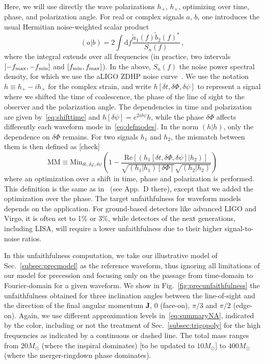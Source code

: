 \documentclass[aps,showpacs,twocolumn,
prd,superscriptaddress,nofootinbib]{revtex4-1}
\newcommand{\be}{\begin{equation}}
\newcommand{\ee}{\end{equation}}
\newcommand\ud{{\mathrm{d}}}
\newcommand{\Msol}{M_{\odot}}
\newcommand{\SM}[1]{{\color{Red} #1}}
\begin{document}
Here, we will use directly the wave polarizations $h_{+}$, $h_{\times}$, optimizing over time, phase, and polarization angle. For real or complex signals $a$, $b$, one introduces the usual Hermitian noise-weighted scalar product~\cite{CF94}
\be\label{eq:defoverlap}
	\left( a | b \right) = 2 \int \ud f \frac{\tilde{a}_{1}(f) \tilde{b}_{2}(f)^{*}}{S_{n}(f)} \,,
\ee
where the integral extends over all frequencies (in practice, two intervals $[-f_{\rm max}, -f_{\rm min}]$ and $[f_{\rm min}, f_{\rm max}]$). In the above, $S_{n}(f)$ the noise power spectral density, for which we use the aLIGO ZDHP noise curve~\cite{LIGOProspects13}. We use the notation $h \equiv h_{+} - i h_{\times}$ for the complex strain, and write $h[\delta t, \delta \Phi, \delta \psi]$ to represent a signal where we shifted the time of coalescence, the phase of the line of sight to the observer and the polarization angle. The dependencies in time and polarization are given by~\eqref{eq:shifttime} and $h[\delta \psi] = e^{2 i \delta \psi} h$, while the phase $\delta \Phi$ affects differently each waveform mode in~\eqref{eq:defmodes}. In the norm $(h|h)$, only the dependence on $\delta\Phi$ remains. For two signals $h_{1}$ and $h_{2}$, the mismatch between them is then defined as \SM{[check]}
\be\label{eq:defMM}
	\mathrm{MM} \equiv \mathrm{Min}_{\delta t, \delta \varphi, \delta \psi} \left( 1 - \frac{ \mathrm{Re} \left[ (h_{1}[\delta t, \delta \Phi, \delta \psi] | h_{2}) \right]}{\sqrt{(h_{1}|h_{1})[\delta\Phi]}\sqrt{(h_{2}|h_{2})}} \right)
\ee
where an optimization over a shift in time, phase and polarization is performed. This definition is the same as in~\cite{Blackman+17a} (see App.~D there), except that we added the optimization over the phase. The target unfaithfulness for waveform models depends on the application. For ground-based detectors like advanced LIGO and Virgo, it is often set to 1\% or 3\%, while detectors of the next generations, including LISA, will require a lower unfaithfulness due to their higher signal-to-noise ratios.

In this unfaithfulness computation, we take our illustrative model of Sec.~\ref{subsec:precmodel} as the reference waveform, thus ignoring all limitations of our model for precession and focusing only on the passage from time-domain to Fourier-domain for a given waveform. We show in Fig.~\ref{fig:precunfaithfulness} the unfaithfulness obtained for three inclination angles between the line-of-sight and the direction of the final angular momentum $\bm{J}$, $0$ (face-on), $\pi/3$ and $\pi/2$ (edge-on). Again, we use different approximation levels in~\eqref{eq:summaryNA}, indicated by the color, including or not the treatment of Sec.~\ref{subsec:trigopoly} for the high frequencies as indicated by a continuous or dashed line. The total mass ranges from $20\Msol$ (where the inspiral dominates) \SM{[to be updated to $10 \Msol$]} to $400\Msol$ (where the merger-ringdown phase dominates).
\end{document}
